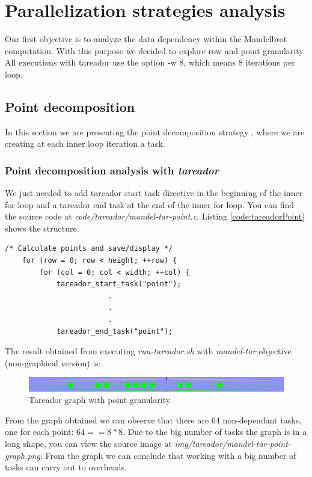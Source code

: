 \documentclass{article}
\begin{document}
\section{Parallelization strategies analysis}
\justify
Our first objective is to analyze the data dependency within the Mandelbrot computation. With this purpose we decided to explore row and point granularity. All executions with tareador use the option -w 8, which means 8 iterations per loop.

\subsection{Point decomposition}
In this section we are presenting the point decomposition strategy , where we are creating at each inner loop iteration a task.
\subsubsection*{Point decomposition analysis with \textit{tareador}}
We just needed to add tareador start task directive in the beginning of the inner for loop and a tareador end task at the end of the inner for loop. You can find the source code at \textit{code/tareador/mandel-tar-point.c}. Listing \ref{code:tareadorPoint} shows the structure.

\begin{lstlisting}[caption={Tareador instrumentation at point granularity},label=code:tareadorPoint]
    /* Calculate points and save/display */
    for (row = 0; row < height; ++row) {
        for (col = 0; col < width; ++col) {
            tareador_start_task("point");
                        .
                        .
                        .
            tareador_end_task("point"); 
\end{lstlisting}

\justify
The result obtained from executing \textit{run-tareador.sh} with \textit{mandel-tar} objective (non-graphical version) is:

\begin{figure}[ht]
    \centering
    \includegraphics[width=1\textwidth]{mandel-tar-point-graph.png}
    \caption{Tareador graph with point granularity}
    \label{fig:tareadorpoint}
\end{figure}
\justify
From the graph obtained we can observe that there are 64 non-dependant tasks, one for each point: $64 == 8*8$. 
Due to the big number of tasks the graph is in a long shape, you can view the source image at \textit{img/tareador/mandel-tar-point-graph.png}. From the graph we can conclude that working with a big number of tasks can carry out to overheads. 
\end{document}
